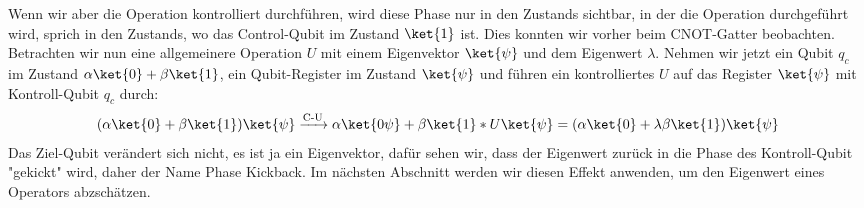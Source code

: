Wenn wir aber die Operation kontrolliert durchführen, wird diese Phase nur in den Zustands sichtbar, in der die Operation durchgeführt wird, sprich in den Zustands, wo das Control-Qubit im Zustand $\ket{1}$ ist. Dies konnten wir vorher beim CNOT-Gatter beobachten. Betrachten wir nun eine allgemeinere Operation $U$ mit einem Eigenvektor $\ket{\psi}$ und dem Eigenwert $\lambda$. Nehmen wir jetzt ein Qubit $q_c$ im Zustand $\alpha\ket{0} + \beta\ket{1}$, ein Qubit-Register im Zustand $\ket{\psi}$ und führen ein kontrolliertes $U$ auf das Register $\ket{\psi}$ mit Kontroll-Qubit $q_c$ durch:
\begin{align*}
(\alpha\ket{0} + \beta\ket{1})\ket{\psi} \xrightarrow{\text{C-U}} \alpha\ket{0\psi} + \beta\ket{1}*U\ket{\psi} = (\alpha\ket{0} + \lambda\beta\ket{1})\ket{\psi}
\end{align*}
Das Ziel-Qubit verändert sich nicht, es ist ja ein Eigenvektor, dafür sehen wir, dass der Eigenwert zurück in die Phase des Kontroll-Qubit "gekickt" wird, daher der Name Phase Kickback. Im nächsten Abschnitt werden wir diesen Effekt anwenden, um den Eigenwert eines Operators abzschätzen.

